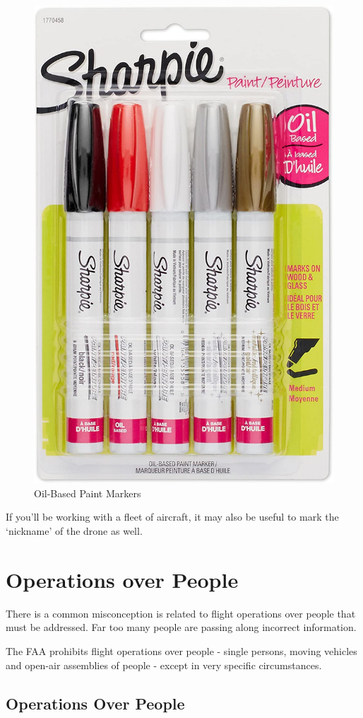 \documentclass[
  12pt,
]{book}
\newenvironment{notebox}{
  \definecolor{shadecolor}{gray}{.8}  %
  \color{black}
  \begin{shaded}}
 {\end{shaded}}
\begin{document}
\begin{figure}

{\centering \includegraphics[width=0.5\linewidth]{images/oil-based-markers} 

}

\caption{Oil-Based Paint Markers}\label{fig:markers}
\end{figure}

If you'll be working with a fleet of aircraft, it may also be useful to mark the `nickname' of the drone as well.

\section{Operations over People}\label{operations-over-people}

There is a common misconception is related to flight operations over people that must be addressed. Far too many people are passing along incorrect information.

\begin{notebox}
The FAA prohibits flight operations over people - single persons, moving vehicles and open-air assemblies of people - except in very specific circumstances.

\end{notebox}

\subsection{Operations Over People}\label{operations-over-people-1}
\end{document}
